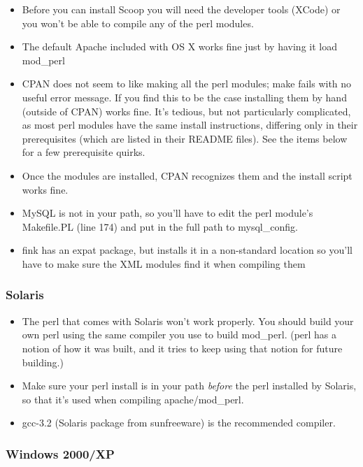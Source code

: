 \begin{itemize}
\item Before you can install Scoop you will need the developer tools (XCode) or you won't be able to compile any of the perl modules.
\item The default Apache included with OS X works fine just by having it load mod\_perl
\item CPAN does not seem to like making all the perl modules; make fails with no useful error message. If you find this to be the case installing them by hand (outside of CPAN) works fine. It's tedious, but not particularly complicated, as most perl modules have the same install instructions, differing only in their prerequisites (which are listed in their README files). See the items below for a few prerequisite quirks.
\item Once the modules are installed, CPAN recognizes them and the install script works fine.
\item MySQL is not in your path, so you'll have to edit the perl module's Makefile.PL (line 174) and put in the full path to mysql\_config.
\item fink has an expat package, but installs it in a non-standard location so you'll have to make sure the XML modules find it when compiling them
\end{itemize}

\subsubsection{Solaris}

\begin{itemize}
\item The perl that comes with Solaris won't work properly. You should build your own perl using the same compiler you use to build mod\_perl. (perl has a notion of how it was built, and it tries to keep using that notion for future building.)
\item Make sure your perl install is in your path {\em before} the perl installed by Solaris, so that it's used when compiling apache/mod\_perl.
\item gcc-3.2 (Solaris package from sunfreeware) is the recommended compiler.
\end{itemize}

\subsubsection{Windows 2000/XP}

